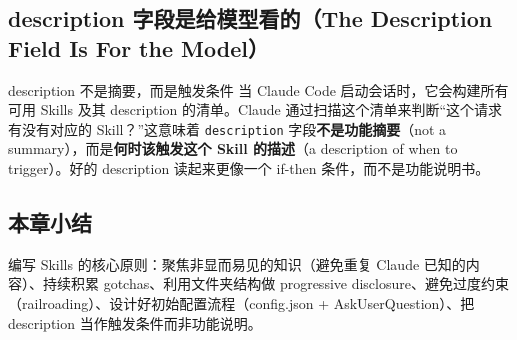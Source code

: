 \subsection{description 字段是给模型看的（The Description Field Is For the Model）}

\begin{importantbox}{description 不是摘要，而是触发条件}
当 Claude Code 启动会话时，它会构建所有可用 Skills 及其 description 的清单。Claude 通过扫描这个清单来判断``这个请求有没有对应的 Skill？''这意味着 \texttt{description} 字段\textbf{不是功能摘要}（not a summary），而是\textbf{何时该触发这个 Skill 的描述}（a description of when to trigger）。好的 description 读起来更像一个 if-then 条件，而不是功能说明书。
\end{importantbox}

\subsection{本章小结}

编写 Skills 的核心原则：聚焦非显而易见的知识（避免重复 Claude 已知的内容）、持续积累 gotchas、利用文件夹结构做 progressive disclosure、避免过度约束（railroading）、设计好初始配置流程（config.json + AskUserQuestion）、把 description 当作触发条件而非功能说明。

